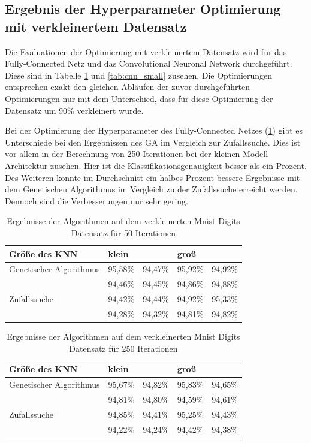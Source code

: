 \subsection{Ergebnis der Hyperparameter Optimierung mit verkleinertem Datensatz}
Die Evaluationen der Optimierung mit verkleinertem Datensatz wird für das Fully-Connected Netz und das Convolutional Neuronal Network durchgeführt. Diese sind in Tabelle \ref{tab:fully_small} und \ref{tab:cnn_small} zusehen. Die Optimierungen entsprechen exakt den gleichen Abläufen der zuvor durchgeführten Optimierungen nur mit dem Unterschied, dass für diese Optimierung der Datensatz um 90\% verkleinert wurde.

Bei der Optimierung der Hyperparameter des Fully-Connected Netzes (\ref{tab:fully_small}) gibt es Unterschiede bei den Ergebnissen des GA im Vergleich zur Zufallssuche. Dies ist vor allem in der Berechnung von 250 Iterationen bei der kleinen Modell Architektur zusehen. Hier ist die Klassifikationsgenauigkeit besser als ein Prozent. Des Weiteren konnte im Durchschnitt ein halbes Prozent bessere Ergebnisse mit dem Genetischen Algorithmus im Vergleich zu der Zufallssuche erreicht werden. Dennoch sind die Verbesserungen nur sehr gering.



\begin{table}[h]
\centering
\caption{Ergebnisse der Algorithmen auf dem verkleinerten Mnist Digits Datensatz für 50 Iterationen}
\label{tab:fully_small}
\begin{tabular}{lllll} 
\toprule
Größe des KNN & \multicolumn{2}{l}{klein} & \multicolumn{2}{l}{groß}  \\ 
\midrule
Genetischer Algorithmus              & 95,58\% & 94,47\%         & 95,92\% & 94,92\%         \\
              & 94,46\% & 94,45\%         & 94,86\% & 94,88\%         \\
Zufallssuche            & 94,42\% & 94,44\%         & 94,92\% & 95,33\%         \\
              & 94,28\% & 94,32\%         & 94,81\% & 94,82\%         \\
\bottomrule
\end{tabular}
\end{table}

\begin{table}[h]
\centering
\caption{Ergebnisse der Algorithmen auf dem verkleinerten Mnist Digits Datensatz für 250 Iterationen}
\label{tab:fully_small_250}
\begin{tabular}{lllll} 
\toprule
Größe des KNN & \multicolumn{2}{l}{klein} & \multicolumn{2}{l}{groß}  \\ 
\midrule
Genetischer Algorithmus            & 95,67\% & 94,82\%         & 95,83\% & 94,65\%         \\
              & 94,81\% & 94,80\%         & 94,59\% & 94,61\%         \\
Zufallssuche            & 94,85\% & 94,41\%         & 95,25\% & 94,43\%         \\
              & 94,22\% & 94,24\%         & 94,42\% & 94,38\%         \\
\bottomrule
\end{tabular}
\end{table}

